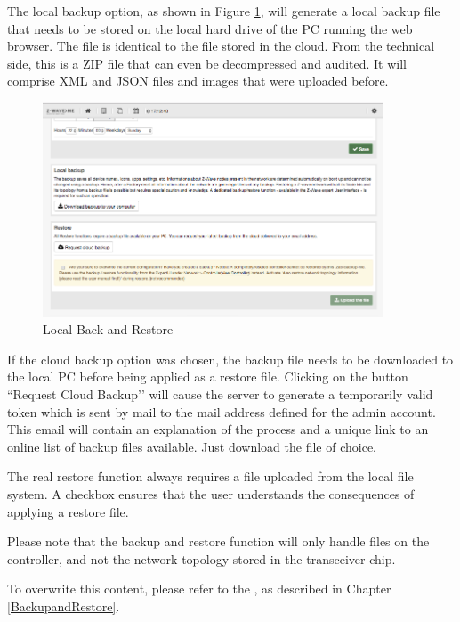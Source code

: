 The local backup option, as shown in Figure \ref{shui75}, will generate a local backup 
file that needs to be stored on the local hard drive of the PC running the web browser. 
The file is identical to the file stored in the cloud. From the technical side, this is 
a ZIP file that can even be decompressed and audited. It will comprise XML and JSON files 
and images that were uploaded before.

\begin{figure}
\begin{center}
\includegraphics[width=0.9\textwidth]{pngs/cap4/shui75.png}
\caption{Local Back and Restore}
\label{shui75}
\end{center}
\end{figure}

If the cloud backup option was chosen, the backup file needs to be downloaded to the 
local PC before being applied as a restore file. Clicking on the button ``Request Cloud Backup’’ 
will cause the server to generate a temporarily valid token which is sent by mail to the 
mail address defined for the admin account. This email will contain an explanation of the 
process and a unique link to an online list of backup files available. Just download the file of choice.

The real restore function always requires a file uploaded from the local file system. A 
checkbox ensures that the user understands the consequences of applying a restore file.

Please note that the backup and restore function will only handle files on the controller, 
and not the \zwave network topology stored in the \zwave transceiver chip.

To overwrite this content, please refer to the \zweui, as 
described in Chapter \ref{BackupandRestore}.


